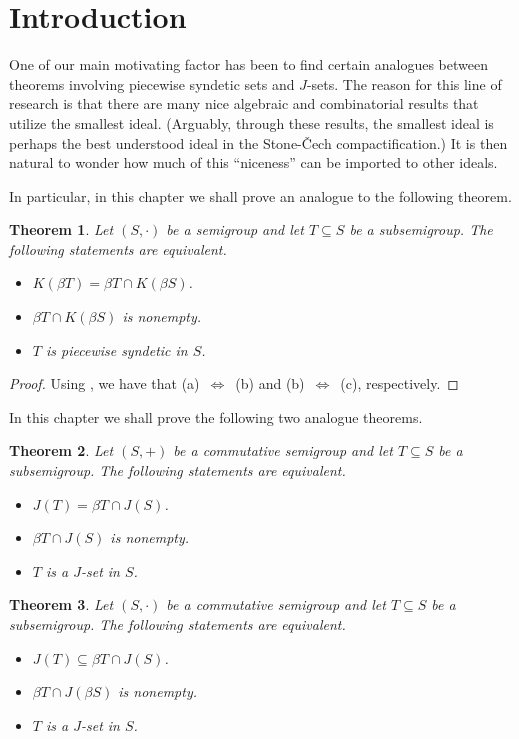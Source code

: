 \documentclass[12pt]{article}
\theoremstyle{plain}
\newtheorem{thm}{Theorem}[section]
\theoremstyle{definition}
\begin{document}
\section{Introduction}
One of our main motivating factor has been to find certain analogues between theorems involving piecewise syndetic sets and $J$-sets. 
The reason for this line of research is that there are many nice algebraic and combinatorial results that utilize the smallest ideal. 
(Arguably, through these results, the smallest ideal is perhaps the
best understood ideal in the Stone-\v{C}ech compactification.)
It is then natural to wonder how much of this ``niceness'' can be
imported to other ideals.

In particular, in this chapter we shall prove an analogue to the following theorem. 
\begin{thm}
  Let $(S,\cdot)$ be a semigroup and let $T \subseteq S$ be a
  subsemigroup. 
  The following statements are equivalent.
  \begin{itemize}
    \item[(a)] $K(\beta T) = \beta T \cap K(\beta S)$.
    \item[(b)] $\beta T \cap K(\beta S)$ is nonempty.
    \item[(c)] $T$ is piecewise syndetic in $S$.
  \end{itemize}
\end{thm}
\begin{proof}
  Using \cite[Theorems 1.65 and 4.40]{Hindman:1998fk}, we have that
  \mbox{(a) $\iff$ (b)} and \mbox{(b) $\iff$ (c)}, respectively. 
\end{proof}

In this chapter we shall prove the following two analogue theorems.
\begin{thm}
  \label{thm:comm-subsemi}
  Let $(S, +)$ be a commutative semigroup and let $T \subseteq S$ be a
  subsemigroup. 
  The following statements are equivalent.
  \begin{itemize}
    \item[(a)] $J(T) = \beta T \cap J(S)$.
    \item[(b)] $\beta T \cap J(S)$ is nonempty.
    \item[(c)] $T$ is a $J$-set in $S$.
  \end{itemize}
\end{thm}

\begin{thm}
  Let $(S, \cdot)$ be a commutative semigroup and let $T \subseteq S$ be a  subsemigroup. 
  The following statements are equivalent.
  \begin{itemize}
    \item[(a)] $J(T) \subseteq \beta T \cap J(S)$.
    \item[(b)] $\beta T \cap J(\beta S)$ is nonempty.
    \item[(c)] $T$ is a $J$-set in $S$.
  \end{itemize}
\end{thm}
\end{document}
